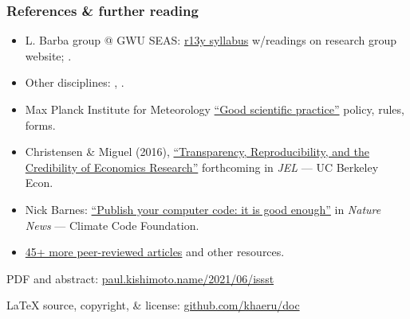\documentclass[12pt,aspectratio=169]{beamer}
\begin{document}
\begin{frame}[allowframebreaks]
\frametitle{References \& further reading}

\nocite{huppmann-2020}
\printbibliography[heading=none]

\begin{itemize}
  \small
  \item L. Barba group @ GWU SEAS: \href{http://lorenabarba.com/blog/barbagroup-reproducibility-syllabus/}{r13y syllabus} w/readings on research group website; .
  \item Other disciplines: \cite{irving-2016}, \cite{pauliuk-2019}.
  \item Max Planck Institute for Meteorology \href{http://mpimet.mpg.de/en/science/publications/good-scientific-practice.html}{``Good scientific practice''} policy, rules, forms.
  \item Christensen \& Miguel (2016), \href{http:/dx.doi.org/10.3386/w22989}{``Transparency, Reproducibility, and the Credibility of Economics Research''} forthcoming in \emph{JEL} — UC Berkeley Econ.
  \item Nick Barnes: \href{https://www.nature.com/news/2010/101013/full/467753a.html}{``Publish your computer code: it is good enough''} in \emph{Nature News} — Climate Code Foundation.
  \item \href{http://ropensci.github.io/reproducibility-guide/sections/references/}{45+ more peer-reviewed articles} and other resources.
\end{itemize}

\medskip
{}

PDF and abstract: \href{http://paul.kishimoto.name/2021/06/issst}{paul.kishimoto.name/2021/06/issst}

LaTeX source, copyright, \& license: \href{https://github.com/khaeru/doc/}{github.com/khaeru/doc}
\medskip

\end{frame}
\end{document}
